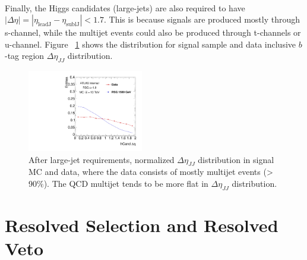 \paragraph{}
Finally, the Higgs candidates (large-\R jets) are also required to have $|\Delta\eta| = |\eta_{\text{leadJ}} -\eta_{\text{sublJ}} |< 1.7$. This is because signals are produced mostly through s-channel, while the multijet events could also be produced through t-channels or u-channel. Figure ~\ref{fig:app-check-deta} shows the distribution for signal sample and data inclusive $b$-tag region $\Delta \eta_{JJ}$ distribution.

\begin{figure}
\begin{center}
  \includegraphics[width=0.45\textwidth,angle=-90]{figures/boosted/Other/AllTag_Signal_hCandDeta_F_c10-cb-no-deta-cut_truth_0.pdf}
  \caption{ After large-\R jet requirements, normalized $\Delta \eta_{JJ}$ distribution in signal MC and data, where the data consists of mostly multijet events (> 90$\%$). The QCD multijet tends to be more flat in $\Delta \eta_{JJ}$ distribution.}
\label{fig:app-check-deta}
\end{center}
\end{figure}


\section{Resolved Selection and Resolved Veto}
\label{sec:resollvedveto}
